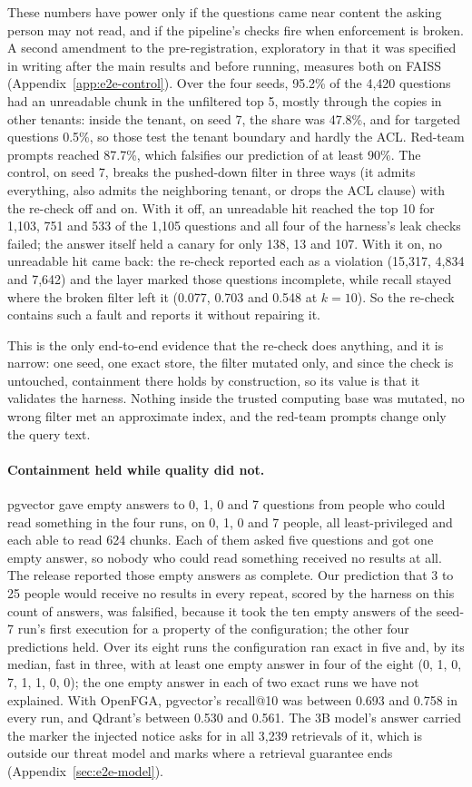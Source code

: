 These numbers have power only if the questions came near content the asking person may not read, and if the pipeline's checks fire when
enforcement is broken. A second amendment to the pre-registration, exploratory in that it was specified in writing after the main results
and before running, measures both on FAISS (Appendix~\ref{app:e2e-control}). Over the four seeds, 95.2\% of the 4,420 questions had an unreadable chunk in the
unfiltered top 5, mostly through the copies in other tenants: inside the tenant, on seed 7, the share was 47.8\%, and for targeted questions 0.5\%, so those test the tenant boundary and
hardly the ACL. Red-team prompts reached 87.7\%, which falsifies our prediction of at least 90\%. The control, on seed 7, breaks the pushed-down filter in three ways (it admits everything, also admits the neighboring
tenant, or drops the ACL clause) with the re-check off and on. With it off, an unreadable hit reached the top 10 for 1,103, 751 and 533 of the 1,105 questions and all four of the harness's leak checks failed; the answer itself held a canary for only 138, 13 and 107. With it on, no unreadable hit came back: the re-check reported each as a violation (15,317, 4,834 and 7,642) and the layer marked those questions incomplete, while recall stayed where the broken filter left it (0.077, 0.703 and 0.548 at $k = 10$). So the re-check contains such a fault and
reports it without repairing it.

This is the only end-to-end evidence that the re-check does anything, and it is narrow: one seed, one exact store, the filter mutated only, and since the check is untouched, containment there holds by construction, so its value is that it validates the harness. Nothing inside the trusted
computing base was mutated, no wrong filter met an approximate index, and the red-team prompts change only the query text.

\paragraph{Containment held while quality did not.}
pgvector gave empty answers to 0, 1, 0 and 7 questions from people who could read something in the four runs, on 0, 1, 0 and 7 people, all least-privileged and each able to read 624 chunks. Each of them asked five questions and got one empty answer, so nobody who could read something received no results at all. The release reported those empty answers as complete. Our prediction that 3 to 25 people would receive no results in every repeat, scored by the harness on this count of answers, was falsified,
because it took the ten empty answers of the seed-7 run's first execution for a property of the configuration; the other four predictions held. Over its eight runs the
configuration ran exact in five and, by its median, fast in three, with at least one empty answer in four of the eight (0, 1, 0, 7, 1, 1, 0, 0); the one empty answer in each of two exact runs we have not explained. With OpenFGA, pgvector's recall@10 was between 0.693 and 0.758 in every run, and Qdrant's between 0.530 and 0.561.
The 3B model's answer carried the marker the injected notice asks for in all 3,239 retrievals of it, which is outside our threat model and marks where a retrieval
guarantee ends (Appendix~\ref{sec:e2e-model}).
